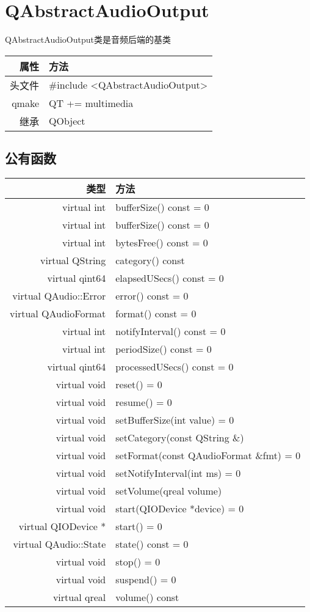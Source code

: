 \chapter{QAbstractAudioOutput}

QAbstractAudioOutput类是音频后端的基类

\begin{tabular}{|r|l|}
	\hline
	属性 & 方法 \\
	\hline
	头文件 & \#include <QAbstractAudioOutput>\\      
	\hline
	qmake &QT += multimedia\\      
	\hline
	继承&QObject \\
	\hline
\end{tabular}

\section{公有函数}

\begin{tabular}{|r|l|}
\hline
类型&方法\\
\hline
virtual int	&bufferSize() const = 0\\
\hline
virtual int	&bufferSize() const = 0\\
\hline
virtual int	&bytesFree() const = 0\\
\hline
virtual QString	&category() const\\
\hline
virtual qint64	&elapsedUSecs() const = 0\\
\hline
virtual QAudio::Error	&error() const = 0\\
\hline
virtual QAudioFormat	&format() const = 0\\
\hline
virtual int	& notifyInterval() const = 0\\
\hline
virtual int	& periodSize() const = 0\\
\hline
virtual qint64	&processedUSecs() const = 0\\
\hline
virtual void	&reset() = 0\\
\hline
virtual void	&resume() = 0\\
\hline
virtual void&	setBufferSize(int value) = 0\\
\hline
virtual void&	setCategory(const QString \&)\\
\hline
virtual void&	setFormat(const QAudioFormat \&fmt) = 0\\
\hline
virtual void&	setNotifyInterval(int ms) = 0\\
\hline
virtual void&	setVolume(qreal volume)\\
\hline
virtual void&	start(QIODevice *device) = 0\\
\hline
virtual QIODevice *	&start() = 0\\
\hline
virtual QAudio::State	&state() const = 0\\
\hline
virtual void	&stop() = 0\\
\hline
virtual void	&suspend() = 0 \\
\hline
virtual qreal	&volume() const\\
\hline
\end{tabular}

